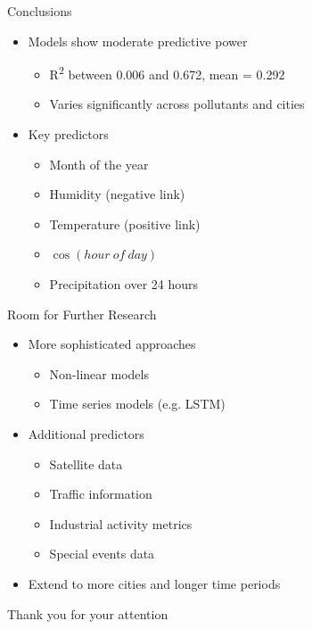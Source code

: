 \documentclass[svgnames, 12pt]{beamer}
\begin{document}
\begin{frame}{Conclusions}
\begin{itemize}
    \item Models show moderate predictive power
        \begin{itemize}
            \item R\textsuperscript{2} between 0.006 and 0.672, mean = 0.292
            \item Varies significantly across pollutants and cities
        \end{itemize}
    \item Key predictors
        \begin{itemize}
            \item Month of the year
            \item Humidity (negative link)
            \item Temperature (positive link)
            \item $\cos(hour\ of\ day)$
            \item Precipitation over 24 hours
        \end{itemize}
\end{itemize}
\end{frame}

\begin{frame}{Room for Further Research}
\begin{itemize}
    \item More sophisticated approaches
        \begin{itemize}
            \item Non-linear models
            \item Time series models (e.g. LSTM)
        \end{itemize}
    \item Additional predictors
        \begin{itemize}
            \item Satellite data
            \item Traffic information
            \item Industrial activity metrics
            \item Special events data
        \end{itemize}
    \item Extend to more cities and longer time periods
\end{itemize}
\end{frame}


\begin{frame}
\begin{center}
\LARGE
\color{mifcolor} Thank you for your attention
\end{center}
\end{frame}
\end{document}
